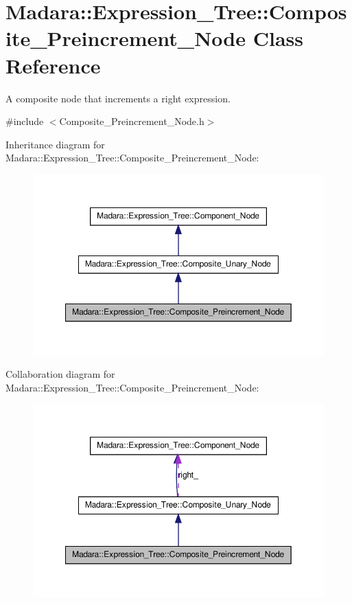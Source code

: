 \hypertarget{classMadara_1_1Expression__Tree_1_1Composite__Preincrement__Node}{
\section{Madara::Expression\_\-Tree::Composite\_\-Preincrement\_\-Node Class Reference}
\label{d6/db4/classMadara_1_1Expression__Tree_1_1Composite__Preincrement__Node}
}


A composite node that increments a right expression.  




{\ttfamily \#include $<$Composite\_\-Preincrement\_\-Node.h$>$}



Inheritance diagram for Madara::Expression\_\-Tree::Composite\_\-Preincrement\_\-Node:
\nopagebreak
\begin{figure}[H]
\begin{center}
\leavevmode
\includegraphics[width=352pt]{d0/d07/classMadara_1_1Expression__Tree_1_1Composite__Preincrement__Node__inherit__graph}
\end{center}
\end{figure}


Collaboration diagram for Madara::Expression\_\-Tree::Composite\_\-Preincrement\_\-Node:
\nopagebreak
\begin{figure}[H]
\begin{center}
\leavevmode
\includegraphics[width=352pt]{d9/d5b/classMadara_1_1Expression__Tree_1_1Composite__Preincrement__Node__coll__graph}
\end{center}
\end{figure}
